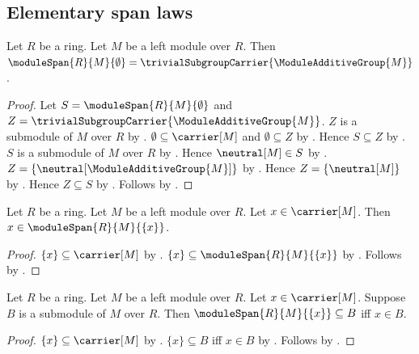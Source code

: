\subsection{Elementary span laws}

\begin{theorem}\label{module_span_empty}
    Let $R$ be a ring.
    Let $M$ be a left module over $R$.
    Then $\moduleSpan{R}{M}{\emptyset}
        =\trivialSubgroupCarrier{\ModuleAdditiveGroup{M}}$.
\end{theorem}
\begin{proof}
    Let $S=\moduleSpan{R}{M}{\emptyset}$ and
        $Z=\trivialSubgroupCarrier{\ModuleAdditiveGroup{M}}$.
    $Z$ is a submodule of $M$ over $R$ by .
    $\emptyset\subseteq\carrier[M]$ and $\emptyset\subseteq Z$ by
        .
    Hence $S\subseteq Z$ by .
    $S$ is a submodule of $M$ over $R$ by
        .
    Hence $\neutral[M]\in S$ by .
    $Z=\{\neutral[\ModuleAdditiveGroup{M}]\}$ by
        .
    Hence $Z=\{\neutral[M]\}$ by
        .
    Hence $Z\subseteq S$ by .
    Follows by .
\end{proof}

\begin{proposition}\label{module_span_singleton_contains}
    Let $R$ be a ring.
    Let $M$ be a left module over $R$.
    Let $x\in\carrier[M]$.
    Then $x\in\moduleSpan{R}{M}{\{x\}}$.
\end{proposition}
\begin{proof}
    $\{x\}\subseteq\carrier[M]$ by
        .
    $\{x\}\subseteq\moduleSpan{R}{M}{\{x\}}$ by
        .
    Follows by .
\end{proof}

\begin{theorem}\label{module_span_singleton_least_iff}
    Let $R$ be a ring.
    Let $M$ be a left module over $R$.
    Let $x\in\carrier[M]$.
    Suppose $B$ is a submodule of $M$ over $R$.
    Then $\moduleSpan{R}{M}{\{x\}}\subseteq B$ iff $x\in B$.
\end{theorem}
\begin{proof}
    $\{x\}\subseteq\carrier[M]$ by
        .
    $\{x\}\subseteq B$ iff $x\in B$ by
        .
    Follows by .
\end{proof}

